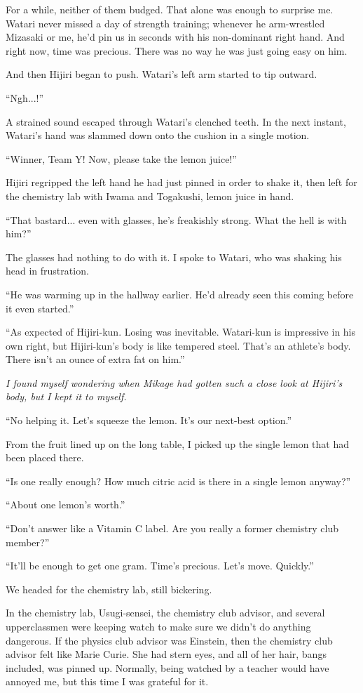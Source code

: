 \documentclass[
    a4paper,
    12pt,
    twoside,
    openany,
    UTF8,
    fontset=windows
]{ctexbook}
\begin{document}
For a while, neither of them budged. That alone was enough to surprise me. Watari never missed a day of strength training; whenever he arm-wrestled Mizasaki or me, he'd pin us in seconds with his non-dominant right hand. And right now, time was precious. There was no way he was just going easy on him.

And then Hijiri began to push. Watari's left arm started to tip outward.

``Ngh...!''

A strained sound escaped through Watari's clenched teeth. In the next instant, Watari's hand was slammed down onto the cushion in a single motion.

``Winner, Team Y! Now, please take the lemon juice!''

Hijiri regripped the left hand he had just pinned in order to shake it, then left for the chemistry lab with Iwama and Togakushi, lemon juice in hand.

``That bastard... even with glasses, he's freakishly strong. What the hell is with him?''

The glasses had nothing to do with it. I spoke to Watari, who was shaking his head in frustration.

``He was warming up in the hallway earlier. He'd already seen this coming before it even started.''

``As expected of Hijiri-kun. Losing was inevitable. Watari-kun is impressive in his own right, but Hijiri-kun's body is like tempered steel. That's an athlete's body. There isn't an ounce of extra fat on him.''

\textit{I found myself wondering when Mikage had gotten such a close look at Hijiri's body, but I kept it to myself.}

``No helping it. Let's squeeze the lemon. It's our next-best option.''

From the fruit lined up on the long table, I picked up the single lemon that had been placed there.

``Is one really enough? How much citric acid is there in a single lemon anyway?''

``About one lemon's worth.''

``Don't answer like a Vitamin C label. Are you really a former chemistry club member?''

``It'll be enough to get one gram. Time's precious. Let's move. Quickly.''

We headed for the chemistry lab, still bickering.

In the chemistry lab, Usugi-sensei, the chemistry club advisor, and several upperclassmen were keeping watch to make sure we didn't do anything dangerous. If the physics club advisor was Einstein, then the chemistry club advisor felt like Marie Curie. She had stern eyes, and all of her hair, bangs included, was pinned up. Normally, being watched by a teacher would have annoyed me, but this time I was grateful for it.
\end{document}
